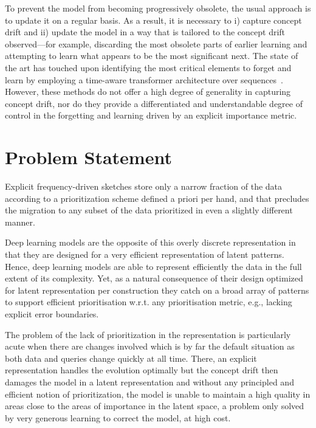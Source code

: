 To prevent the model from becoming progressively obsolete, the usual approach is to update it on a regular basis.
% 
As a result, it is necessary to i) capture concept drift and ii) update the model in a way that is tailored to the concept drift observed---for example, discarding the most obsolete parts of earlier learning and attempting to learn what appears to be the most significant next.
% 
The state of the art has touched upon identifying the most critical elements to forget and learn by employing a time-aware transformer architecture over sequences~\cite{zhang2020time,ren2021rapt,sawhney2020time}.
% 
However, these methods do not offer a high degree of generality in capturing concept drift, nor do they provide a differentiated and understandable degree of control in the forgetting and learning driven by an explicit importance metric.


\section{Problem Statement}

Explicit frequency-driven sketches store only a narrow fraction of the data according to a prioritization scheme defined a priori per hand, and that precludes the migration to any subset of the data prioritized in even a slightly different manner.

Deep learning models are the opposite of this overly discrete representation in that they are designed for a very efficient representation of latent patterns. Hence, deep learning models are able to represent efficiently the data in the full extent of its complexity. Yet, as a natural consequence of their design optimized for latent representation per construction they catch on a broad array of patterns to support efficient prioritisation w.r.t. any prioritisation metric, e.g., lacking explicit error boundaries.

The problem of the lack of prioritization in the representation is particularly acute when there are changes involved which is by far the default situation as both data and queries change quickly at all time. There, an explicit representation handles the evolution optimally but the concept drift then damages the model in a latent representation and without any principled and efficient notion of prioritization, the model is unable to maintain a high quality in areas close to the areas of importance in the latent space, a problem only solved by very generous learning to correct the model, at high cost.

